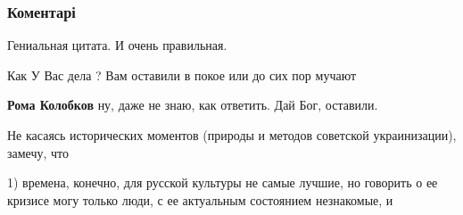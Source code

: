  
 
 
 
 
\subsubsection{Коментарі}
\label{sec:30_07_2021.fb.bilchenko_evgenia.1.spasibo_mirosja_citata.cmt}

\begin{itemize}
 
Гениальная цитата. И очень правильная.

 
Как У Вас дела ?
Вам оставили в покое или до сих пор мучают

\begin{itemize}
 
\textbf{Рома Колобков} ну, даже не знаю, как ответить. Дай Бог, оставили.
\end{itemize}

 

Не касаясь исторических моментов (природы и методов советской украинизации),
замечу, что 

1) времена, конечно, для русской культуры не самые лучшие, но
говорить о ее кризисе могу только люди, с ее актуальным состоянием незнакомые,
и 


\end{itemize}
